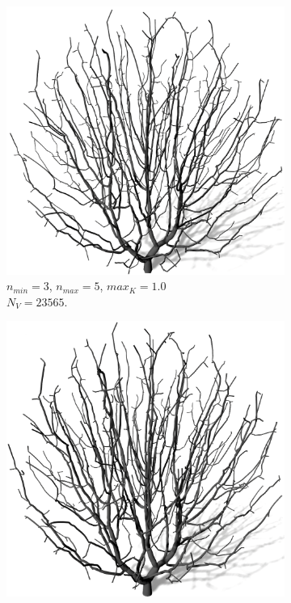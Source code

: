 \begin{figure} [hbtp]
	\centering
	\begin{subfigure}[t]{.45\textwidth}
		\centering
		\includegraphics[height=.2\textheight]{images/SCA_Quali_SegmentsLow.png}
		\caption{$n_{min} = 3$, $n_{max} = 5$, $max_K = 1.0$\\ $N_V = 23565$.}
		\label{subfig:SCA_Quali_SegmentsLow}
	\end{subfigure}
	\hspace{.05\linewidth}
	\begin{subfigure}[t]{.45\textwidth}
		\centering
		\includegraphics[height=.2\textheight]{images/SCA_Quali_SegmentsHigh.png}

\end{subfigure}
\end{figure}
